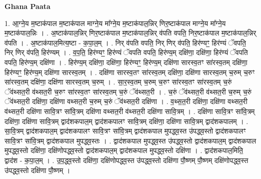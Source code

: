 \documentclass[17pt]{extarticle}
\begin{document}
\textbf{Ghana Paata } \newline

1. आ॒ग्ने॒य म॒ष्टाक॑पाल म॒ष्टाक॑पाल माग्ने॒य मा᳚ग्ने॒य म॒ष्टाक॑पाल॒न्निर् णिर॒ष्टाक॑पाल माग्ने॒य मा᳚ग्ने॒य म॒ष्टाक॑पाल॒न्निः । . अ॒ष्टाक॑पाल॒न्निर् णिर॒ष्टाक॑पाल म॒ष्टाक॑पाल॒न्निर् व॑पति वपति॒ निर॒ष्टाक॑पाल म॒ष्टाक॑पाल॒न्निर् व॑पति । . अ॒ष्टाक॑पाल॒मित्य॒ष्टा - क॒पा॒ल॒म् । . निर् व॑पति वपति॒ निर् णिर् व॑पति॒ हिर॑ण्यꣳ॒॒ हिर॑ण्यं ॅवपति॒ निर् णिर् व॑पति॒ हिर॑ण्यम् । . व॒प॒ति॒ हिर॑ण्यꣳ॒॒ हिर॑ण्यं ॅवपति वपति॒ हिर॑ण्य॒म् दक्षि॑णा॒ दक्षि॑णा॒ हिर॑ण्यं ॅवपति वपति॒ हिर॑ण्य॒म् दक्षि॑णा । . हिर॑ण्य॒म् दक्षि॑णा॒ दक्षि॑णा॒ हिर॑ण्यꣳ॒॒ हिर॑ण्य॒म् दक्षि॑णा सारस्व॒तꣳ सा॑रस्व॒तम् दक्षि॑णा॒ हिर॑ण्यꣳ॒॒ हिर॑ण्य॒म् दक्षि॑णा सारस्व॒तम् । . दक्षि॑णा सारस्व॒तꣳ सा॑रस्व॒तम् दक्षि॑णा॒ दक्षि॑णा सारस्व॒तम् च॒रुम् च॒रुꣳ सा॑रस्व॒तम् दक्षि॑णा॒ दक्षि॑णा सारस्व॒तम् च॒रुम् । . सा॒र॒स्व॒तम् च॒रुम् च॒रुꣳ सा॑रस्व॒तꣳ सा॑रस्व॒तम् च॒रुं ॅव॑थ्सत॒री व॑थ्सत॒री च॒रुꣳ सा॑रस्व॒तꣳ सा॑रस्व॒तम् च॒रुं ॅव॑थ्सत॒री । . च॒रुं ॅव॑थ्सत॒री व॑थ्सत॒री च॒रुम् च॒रुं ॅव॑थ्सत॒री दक्षि॑णा॒ दक्षि॑णा वथ्सत॒री च॒रुम् च॒रुं ॅव॑थ्सत॒री दक्षि॑णा । . व॒थ्स॒त॒री दक्षि॑णा॒ दक्षि॑णा वथ्सत॒री व॑थ्सत॒री दक्षि॑णा सावि॒त्रꣳ सा॑वि॒त्रम् दक्षि॑णा वथ्सत॒री व॑थ्सत॒री दक्षि॑णा सावि॒त्रम् । . दक्षि॑णा सावि॒त्रꣳ सा॑वि॒त्रम् दक्षि॑णा॒ दक्षि॑णा सावि॒त्रम् द्वाद॑शकपाल॒म् द्वाद॑शकपालꣳ सावि॒त्रम् दक्षि॑णा॒ दक्षि॑णा सावि॒त्रम् द्वाद॑शकपालम् । . सा॒वि॒त्रम् द्वाद॑शकपाल॒म् द्वाद॑शकपालꣳ सावि॒त्रꣳ सा॑वि॒त्रम् द्वाद॑शकपाल मुपद्ध्व॒स्त उ॑पद्ध्व॒स्तो द्वाद॑शकपालꣳ सावि॒त्रꣳ सा॑वि॒त्रम् द्वाद॑शकपाल मुपद्ध्व॒स्तः । . द्वाद॑शकपाल मुपद्ध्व॒स्त उ॑पद्ध्व॒स्तो द्वाद॑शकपाल॒म् द्वाद॑शकपाल मुपद्ध्व॒स्तो दक्षि॑णा॒ दक्षि॑णोपद्ध्व॒स्तो द्वाद॑शकपाल॒म् द्वाद॑शकपाल मुपद्ध्व॒स्तो दक्षि॑णा । . द्वाद॑शकपाल॒मिति॒ द्वाद॑श - क॒पा॒ल॒म् । . उ॒प॒द्ध्व॒स्तो दक्षि॑णा॒ दक्षि॑णोपद्ध्व॒स्त उ॑पद्ध्व॒स्तो दक्षि॑णा पौ॒ष्णम् पौ॒ष्णम् दक्षि॑णोपद्ध्व॒स्त उ॑पद्ध्व॒स्तो दक्षि॑णा पौ॒ष्णम् । \newline
\end{document}
